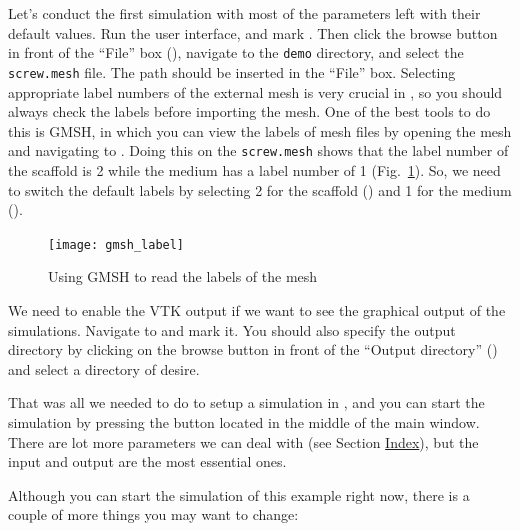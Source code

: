 Let's conduct the first simulation with most of the parameters left with their default values. Run the user interface, and mark . Then click the browse button in front of the ``File'' box (), navigate to the \verb|demo| directory, and select the \verb|screw.mesh| file. The path should be inserted in the ``File'' box. Selecting appropriate label numbers of the external mesh is very crucial in \biodeg{}, so you should always check the labels before importing the mesh. One of the best tools to do this is GMSH, in which you can view the labels of mesh files by opening the mesh and navigating to . Doing this on the \verb|screw.mesh| shows that the label number of the scaffold is 2 while the medium has a label number of 1 (Fig.~\ref{fig:gmsh_label}). So, we need to switch the default labels by selecting 2 for the scaffold () and 1 for the medium ().

\begin{figure}[h]
\center \texttt{[image: gmsh\_label]}
\caption{Using GMSH to read the labels of the mesh} \label{fig:gmsh_label}
\end{figure}

We need to enable the VTK output if we want to see the graphical output of the simulations. Navigate to  and mark it. You should also specify the output directory by clicking on the browse button in front of the ``Output directory'' () and select a directory of desire. 

That was all we needed to do to setup a simulation in \biodeg{}, and you can start the simulation by pressing the  button located in the middle of the main window. There are lot more parameters we can deal with (see Section \hyperref[sec:index]{Index}), but the input and output are the most essential ones. 

Although you can start the simulation of this example right now, there is a couple of more things you may want to change:

